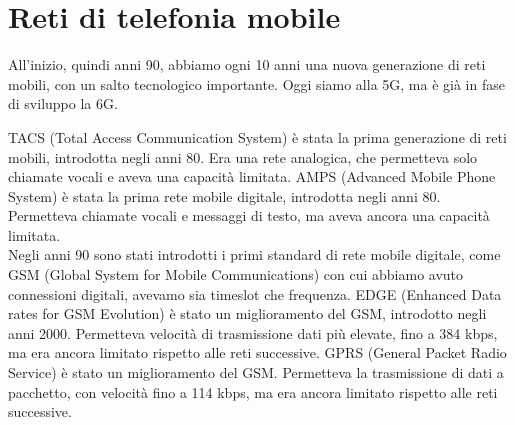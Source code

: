 \section{Reti di telefonia mobile}
All'inizio, quindi anni 90, abbiamo ogni 10 anni una nuova generazione di reti mobili, con un salto tecnologico importante. Oggi siamo alla 5G, ma è già in fase di sviluppo la 6G.

TACS (Total Access Communication System) è stata la prima generazione di reti mobili, introdotta negli anni 80. Era una rete analogica, che permetteva solo chiamate vocali e aveva una capacità limitata.
AMPS (Advanced Mobile Phone System) è stata la prima rete mobile digitale, introdotta negli anni 80. Permetteva chiamate vocali e messaggi di testo, ma aveva ancora una capacità limitata.\\

Negli anni 90 sono stati introdotti i primi standard di rete mobile digitale, come GSM (Global System for Mobile Communications) con cui abbiamo avuto connessioni digitali, avevamo sia timeslot che frequenza.
EDGE (Enhanced Data rates for GSM Evolution) è stato un miglioramento del GSM, introdotto negli anni 2000. Permetteva velocità di trasmissione dati più elevate, fino a 384 kbps, ma era ancora limitato rispetto alle reti successive.
GPRS (General Packet Radio Service) è stato un miglioramento del GSM. Permetteva la trasmissione di dati a pacchetto, con velocità fino a 114 kbps, ma era ancora limitato rispetto alle reti successive.

